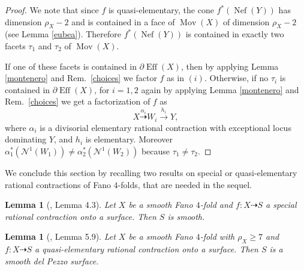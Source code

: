 \documentclass[a4paper,12pt]{amsart}
\newtheorem{lemma}[thm]{Lemma}
\theoremstyle{definition}
\numberwithin{figure}{section}
\numberwithin{table}{section}
\newcommand{\Nu}{\mathcal{N}^1}
\newcommand{\Eff}{\operatorname{Eff}}
\newcommand{\Nef}{\operatorname{Nef}}
\newcommand{\Mov}{\operatorname{Mov}}
\begin{document}
\begin{proof}
 We note that since $f$ is quasi-elementary, the cone  $f^*(\Nef(Y))$ has dimension $\rho_X-2$ and is contained in a face of $\Mov(X)$ of dimension $\rho_X-2$ (see  Lemma \ref{eubea}). Therefore
$f^*(\Nef(Y))$  is contained 
in exactly two facets $\tau_1$ and $\tau_2$ of 
$\Mov(X)$.

If one of these facets is contained in $\partial\Eff(X)$, then by applying Lemma \ref{montenero} and Rem.~\ref{choices} we factor $f$ as in $(i)$.
Otherwise, if
 no $\tau_i$ is contained in 
$\partial\Eff(X)$, for $i=1,2$ again by applying Lemma \ref{montenero} and Rem.~\ref{choices}
 we get a factorization of $f$ as
 $$X\stackrel{\alpha_i}{\dasharrow}W_i\stackrel{h_i}{\to}Y,$$
where $\alpha_{i}$ is a divisorial elementary rational contraction 
with exceptional locus dominating $Y$, and $h_{i}$ is elementary.
Moreover  $\alpha_1^*(\Nu(W_1))\neq\alpha_2^*(\Nu(W_2))$ because
 $\tau_1\neq\tau_2$.
\end{proof}
We conclude this section by recalling two results on special or quasi-elementary rational contractions of Fano $4$-folds, that are needed in the sequel. 
\begin{lemma}[\cite{fibrations}, Lemma 4.3]\label{specialsurf}
 Let  $X$ be a smooth Fano $4$-fold and $f\colon X\dasharrow S$ a special rational contraction onto a surface. Then $S$ is smooth.
\end{lemma}
\begin{lemma}[\cite{small}, Lemma 5.9]\label{delpezzo}
 Let  $X$ be a smooth Fano $4$-fold with $\rho_X\geq 7$ and $f\colon X\dasharrow S$ a quasi-elementary rational contraction onto a surface. Then $S$ is a smooth del Pezzo surface.
\end{lemma} 
\end{document}
